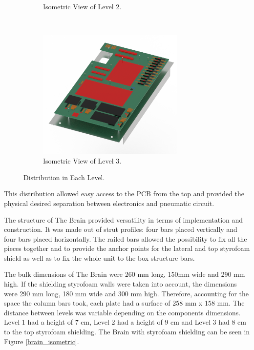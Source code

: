 \begin{figure}[H]
\begin{subfigure}[b]{0.3\textwidth}
    \caption{Isometric View of Level 2.}
    \label{level_2}
    \end{subfigure}
    ~
    \begin{subfigure}[b]{0.3\textwidth}
    \centering
    \includegraphics[width=0.8\textwidth]{4-experiment-design/img/Mechanical/Figure_24c.png}
    \caption{Isometric View of Level 3.}
    \label{level_3}
    \end{subfigure}
    \caption{Distribution in Each Level.}
    \label{fig:The-brain}
\end{figure}


This distribution allowed easy access to the PCB from the top and provided the physical desired separation between electronics and pneumatic circuit.


\smallskip
The structure of The Brain provided versatility in terms of implementation and construction. It was made out of strut profiles: four bars placed vertically and four bars placed horizontally. The railed bars allowed the possibility to fix all the pieces together and to provide the anchor points for the lateral and top styrofoam shield as well as to fix the whole unit to the box structure bars.

\smallskip
The bulk dimensions of The Brain were 260 mm long, 150mm wide and 290 mm high. If the shielding styrofoam walls were taken into account, the dimensions were 290 mm long, 180 mm wide and 300 mm high.
Therefore, accounting for the space the column bars took, each plate had a surface of 258 mm x 158 mm. The distance between levels was variable depending on the components dimensions. Level 1 had a height of 7 cm, Level 2 had a height of 9 cm and Level 3 had 8 cm to the top styrofoam shielding. The Brain with styrofoam shielding can be seen in Figure \ref{brain_isometric}.

